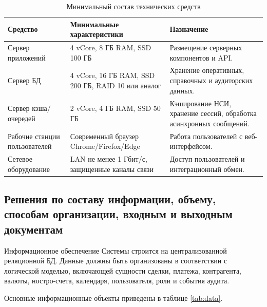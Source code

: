 \documentclass[a4paper,14pt]{extarticle}
\begin{document}
\begin{table}[H]
\centering
\small
\caption{Минимальный состав технических средств}
\label{tab:hardware}
\begin{tabularx}{\linewidth}{|L{40mm}|L{45mm}|X|}
\hline
\textbf{Средство} & \textbf{Минимальные характеристики} & \textbf{Назначение} \\
\hline
Сервер приложений & 4 vCore, 8 ГБ RAM, SSD 100 ГБ & Размещение серверных компонентов и API. \\
\hline
Сервер БД & 4 vCore, 16 ГБ RAM, SSD 200 ГБ, RAID 10 или аналог & Хранение оперативных, справочных и аудиторских данных. \\
\hline
Сервер кэша/очередей & 2 vCore, 4 ГБ RAM, SSD 50 ГБ & Кэширование НСИ, хранение сессий, обработка асинхронных сообщений. \\
\hline
Рабочие станции пользователей & Современный браузер Chrome/Firefox/Edge & Работа пользователей с веб-интерфейсом. \\
\hline
Сетевое оборудование & LAN не менее 1 Гбит/с, защищенные каналы связи & Доступ пользователей и интеграционный обмен. \\
\hline
\end{tabularx}
\end{table}

\subsection{Решения по составу информации, объему, способам организации, входным и выходным документам}
Информационное обеспечение Системы строится на централизованной реляционной БД. Данные должны быть организованы в соответствии с логической моделью, включающей сущности сделки, платежа, контрагента, валюты, ностро-счета, календаря, пользователя, роли и события аудита.

Основные информационные объекты приведены в таблице \ref{tab:data}.
\end{document}
